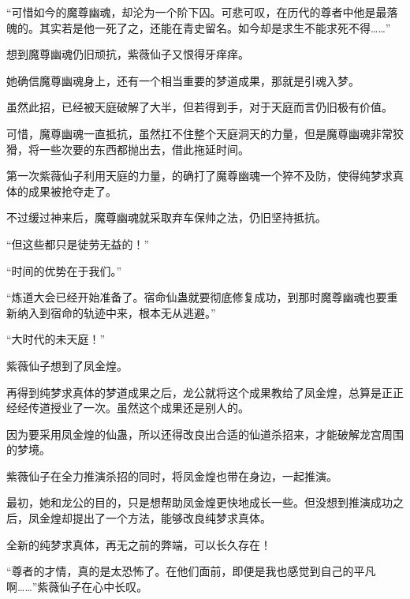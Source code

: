 \begin{this_body}
“可惜如今的魔尊幽魂，却沦为一个阶下囚。可悲可叹，在历代的尊者中他是最落魄的。其实若是他一死了之，还能在青史留名。如今却是求生不能求死不得……”

想到魔尊幽魂仍旧顽抗，紫薇仙子又恨得牙痒痒。

她确信魔尊幽魂身上，还有一个相当重要的梦道成果，那就是引魂入梦。

虽然此招，已经被天庭破解了大半，但若得到手，对于天庭而言仍旧极有价值。

可惜，魔尊幽魂一直抵抗，虽然扛不住整个天庭洞天的力量，但是魔尊幽魂非常狡猾，将一些次要的东西都抛出去，借此拖延时间。

第一次紫薇仙子利用天庭的力量，的确打了魔尊幽魂一个猝不及防，使得纯梦求真体的成果被抢夺走了。

不过缓过神来后，魔尊幽魂就采取弃车保帅之法，仍旧坚持抵抗。

“但这些都只是徒劳无益的！”

“时间的优势在于我们。”

“炼道大会已经开始准备了。宿命仙蛊就要彻底修复成功，到那时魔尊幽魂也要重新纳入到宿命的轨迹中来，根本无从逃避。”

“大时代的未天庭！”

紫薇仙子想到了凤金煌。

再得到纯梦求真体的梦道成果之后，龙公就将这个成果教给了凤金煌，总算是正正经经传道授业了一次。虽然这个成果还是别人的。

因为要采用凤金煌的仙蛊，所以还得改良出合适的仙道杀招来，才能破解龙宫周围的梦境。

紫薇仙子在全力推演杀招的同时，将凤金煌也带在身边，一起推演。

最初，她和龙公的目的，只是想帮助凤金煌更快地成长一些。但没想到推演成功之后，凤金煌却提出了一个方法，能够改良纯梦求真体。

全新的纯梦求真体，再无之前的弊端，可以长久存在！

“尊者的才情，真的是太恐怖了。在他们面前，即便是我也感觉到自己的平凡啊……”紫薇仙子在心中长叹。

\end{this_body}

